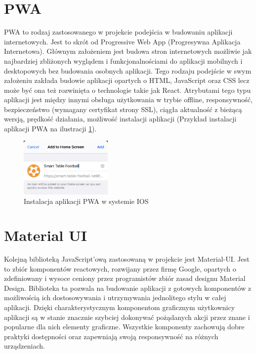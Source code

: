 \label{ch:frontend:pwa}
\section{PWA}
PWA to rodzaj zastosowanego w projekcie podejścia w budowaniu aplikacji internetowych. Jest to skrót od Progressive Web App (Progresywna Aplikacja Internetowa). Głównym założeniem jest budowa stron internetowych możliwie jak najbardziej zbliżonych wyglądem i funkcjonalnościami do aplikacji mobilnych i desktopowych bez budowania osobnych aplikacji. Tego rodzaju podejście w swym założeniu zakłada budowie aplikacji opartych o HTML, JavaScript oraz CSS lecz może być ona też rozwinięta o technologie takie jak React. Atrybutami tego typu aplikacji jest między innymi obsługa użytkowania w trybie offline, responsywność, bezpieczeństwo (wymagany certyfikat strony SSL), ciągła aktualność z bieżącą wersją, prędkość działania, możliwość instalacji aplikacji (Przykład instalacji aplikacji PWA na ilustracji \ref{fig:pwa-installation}).

\begin{figure}[h!]
    \centering
    \includegraphics[width=0.4\textwidth]{images/player/PWA_install.jpg}
    \caption{Instalacja aplikacji PWA w systemie IOS}
    \label{fig:pwa-installation}
\end{figure}

\label{section:material-ui}
\section{Material UI}
Kolejną biblioteką JavaScript'ową zastosowaną w projekcie jest Material-UI. Jest to zbiór komponentów reactowych, rozwijany przez firmę Google, opartych o zdefiniowany i wysoce ceniony przez programistów zbiór zasad designu Material Design. Biblioteka ta pozwala na budowanie aplikacji z gotowych komponentów z możliwością ich dostosowywania i utrzymywania jednolitego stylu w całej aplikacji. Dzięki charakterystycznym komponentom graficznym użytkownicy aplikacji są w stanie znacznie szybciej dokonywać pożądanych akcji przez znane i popularne dla nich elementy graficzne. Wszystkie komponenty zachowują dobre praktyki dostępności oraz zapewniają swoją responsywność na różnych urządzeniach.


